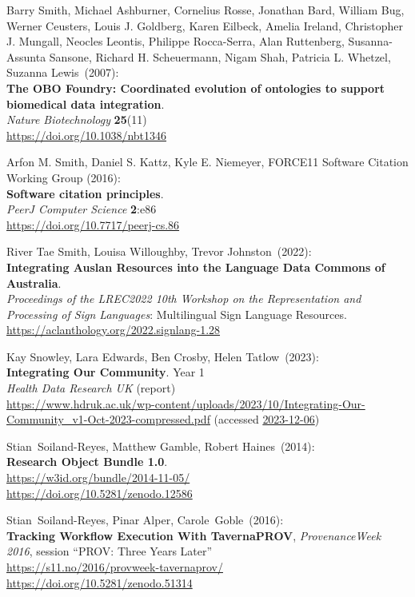 \begin{thebibliography}{9}
Barry Smith, Michael Ashburner, Cornelius Rosse, Jonathan Bard, William Bug, Werner Ceusters, Louis J. Goldberg, Karen Eilbeck, Amelia Ireland, Christopher J. Mungall, Neocles Leontis, Philippe Rocca-Serra, Alan Ruttenberg, Susanna-Assunta Sansone, Richard H. Scheuermann, Nigam Shah, Patricia L. Whetzel, Suzanna Lewis~(2007): \\
\textbf{The {OBO Foundry}:
Coordinated evolution of ontologies to support biomedical data
integration}. \\
\emph{Nature Biotechnology} \textbf{25}(11) \\
\url{https://doi.org/10.1038/nbt1346}

Arfon M. Smith, Daniel S. Kattz, Kyle E. Niemeyer, FORCE11 Software Citation Working Group (2016):\\
\textbf{Software citation principles}.\\
\emph{PeerJ Computer Science} \textbf{2}:e86\\
\url{https://doi.org/10.7717/peerj-cs.86}

River Tae Smith, Louisa Willoughby, Trevor Johnston~(2022): \\
\textbf{Integrating Auslan Resources into the Language Data Commons of Australia}.\\
\emph{Proceedings of the LREC2022 10th Workshop on the Representation and Processing of Sign Languages}: Multilingual Sign Language Resources.\\
\url{https://aclanthology.org/2022.signlang-1.28}

Kay Snowley, Lara Edwards, Ben Crosby, Helen Tatlow~(2023): \\
\textbf{Integrating Our Community}. Year 1 \\
\emph{Health Data Research UK} (report) \\
\url{https://www.hdruk.ac.uk/wp-content/uploads/2023/10/Integrating-Our-Community_v1-Oct-2023-compressed.pdf}
(accessed \href{}{2023-12-06})

Stian~Soiland-Reyes, Matthew Gamble, Robert Haines~(2014): \\
\textbf{Research Object Bundle 1.0}.\\
\url{https://w3id.org/bundle/2014-11-05/}\\
\url{https://doi.org/10.5281/zenodo.12586}

Stian~Soiland-Reyes, Pinar Alper, Carole~Goble~(2016): \\
\textbf{Tracking Workflow Execution With TavernaPROV},
\emph{ProvenanceWeek 2016}, session ``PROV: Three Years Later''\\
\url{https://s11.no/2016/provweek-tavernaprov/}\\
\url{https://doi.org/10.5281/zenodo.51314}


\end{thebibliography}
